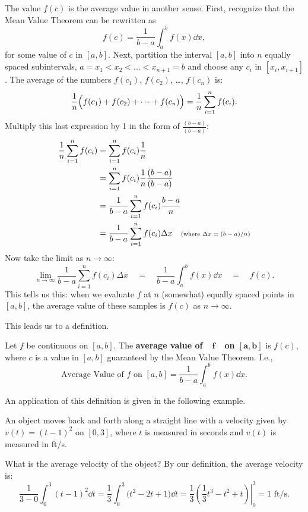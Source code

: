 The value $f(c)$ is the average value in another sense. First, recognize that the Mean Value Theorem can be rewritten as
\[f(c) = \frac{1}{b-a}\int_a^b f(x)\dd x,\]
for some value of $c$ in $[a,b]$. Next, partition the interval $[a,b]$ into $n$ equally spaced subintervals, $a=x_1 < x_2 < \dots < x_{n+1}=b$ and choose any $c_i$ in $[x_i,x_{i+1}]$. The average of the numbers $f(c_1)$, $f(c_2)$, \dots, $f(c_n)$ is:
\[\frac1n\Bigl(f(c_1) + f(c_2) + \dots + f(c_n)\Bigr) = \frac1n\sum_{i=1}^n f(c_i).\]
Multiply this last expression by 1 in the form of $\frac{(b-a)}{(b-a)}$:
\begin{align*}
	\frac1n\sum_{i=1}^n f(c_i)
	&= \sum_{i=1}^n f(c_i)\frac1n \\
	&= \sum_{i=1}^n f(c_i)\frac1n \frac{(b-a)}{(b-a)} \\
	&= \frac{1}{b-a} \sum_{i=1}^n f(c_i)\frac{b-a}n  \\
	&=\frac{1}{b-a} \sum_{i=1}^n f(c_i)\Delta x
	\quad \text{\scriptsize (where $\Delta x = (b-a)/n$)} %
\end{align*}
Now take the limit as $n\to\infty$:
\[
 \lim_{n\to\infty} \frac{1}{b-a} \sum_{i=1}^n f(c_i)\Delta x\quad
 = \quad \frac{1}{b-a} \int_a^b f(x)\dd x\quad = \quad  f(c).
\]
This tells us this: when we evaluate $f$ at $n$ (somewhat) equally spaced points in $[a,b]$, the average value of these samples is $f(c)$ as $n\to\infty$.

This leads us to a definition.

\begin{definition}\label{def:av_val}%
Let $f$ be continuous on $[a,b]$. The \textbf{average value of\ \ $\mathbf{f}$\ \ on $\mathbf{[a,b]}$} is $f(c)$, where $c$ is a value in $[a,b]$ guaranteed by the Mean Value Theorem. I.e., 
\[\text{Average Value of $f$ on $[a,b]$} = \frac{1}{b-a}\int_a^b f(x)\dd x.\]
\end{definition}

An application of this definition is given in the following example.

\begin{example}\label{ex_ftc10}%
An object moves back and forth along a straight line with a velocity given by $v(t) = (t-1)^2$ on $[0,3]$, where $t$ is measured in seconds and $v(t)$ is measured in ft/s.

What is the average velocity of the object?
\solution
By our definition, the average velocity is:
\[
\frac1{3-0}\int_0^3 (t-1)^2\dd t
= \frac13 \int_0^3 \bigl(t^2-2t+1\bigr)\dd t
= \left.\frac13\left(\frac13t^3-t^2+t\right)\right|_0^3
= 1\text{ ft/s}.
\]
\end{example}

